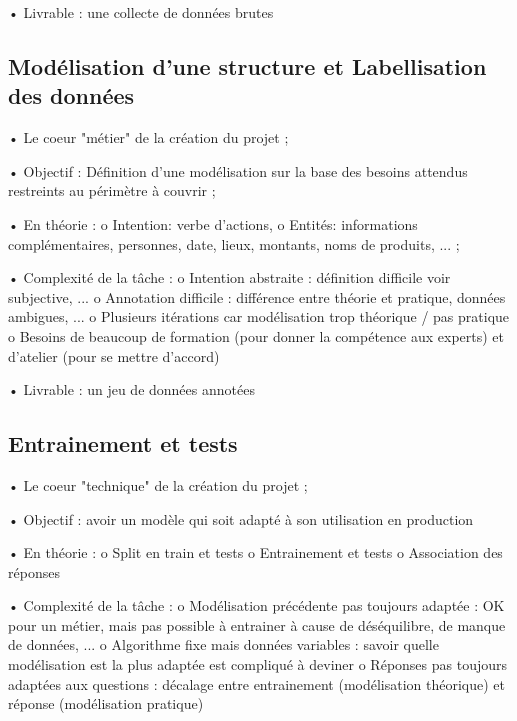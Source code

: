             •   Livrable : une collecte de données brutes

        \subsection{Modélisation d’une structure et Labellisation des données}

            •	Le coeur "métier" de la création du projet ;

            •	Objectif : Définition d'une modélisation sur la base des besoins attendus restreints au périmètre à couvrir ;

            •	En théorie :
                o	Intention: verbe d'actions,
                o	Entités: informations complémentaires, personnes, date, lieux, montants, noms de produits, ... ;

            •   Complexité de la tâche :
                o	Intention abstraite : définition difficile voir subjective, ...
                o	Annotation difficile :  différence entre théorie et pratique, données ambigues, ...
                o	Plusieurs itérations car modélisation trop théorique / pas pratique
                o	Besoins de beaucoup de formation (pour donner la compétence aux experts) et d'atelier (pour se mettre d'accord)

            •   Livrable : un jeu de données annotées

        \subsection{Entrainement et tests}

            •	Le coeur "technique" de la création du projet ;

            •	Objectif : avoir un modèle qui soit adapté à son utilisation en production

            •	En théorie :
                o	Split en train et tests
                o	Entrainement et tests
                o	Association des réponses

            •   Complexité de la tâche :
                o	Modélisation précédente pas toujours adaptée : OK pour un métier, mais pas possible à entrainer à cause de déséquilibre, de manque de données, ...
                o	Algorithme fixe mais données variables : savoir quelle modélisation est la plus adaptée est compliqué à deviner
                o	Réponses pas toujours adaptées aux questions : décalage entre entrainement (modélisation théorique) et réponse (modélisation pratique)

